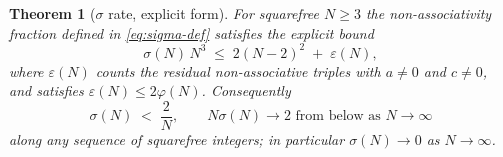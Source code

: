 \documentclass[11pt,reqno]{amsart}
\theoremstyle{plain}
\newtheorem{theorem}{Theorem}
\theoremstyle{definition}
\theoremstyle{remark}
\begin{document}
\begin{theorem}[$\sigma$ rate, explicit form]\label{thm:rate}
For squarefree $N\ge 3$ the non-associativity fraction defined in
\eqref{eq:sigma-def} satisfies the explicit bound
\begin{equation}\label{eq:rate}
  \sigma(N)\,N^{3}\;\le\;2(N-2)^{2}\;+\;\varepsilon(N),
\end{equation}
where $\varepsilon(N)$ counts the residual non-associative triples
with $a\neq 0$ \emph{and} $c\neq 0$, and satisfies
$\varepsilon(N)\le 2\varphi(N)$. Consequently
\begin{equation}\label{eq:rate-asymptotic}
  \sigma(N)\;<\;\frac{2}{N},
  \qquad N\sigma(N)\to 2 \text{ from below as } N\to\infty
\end{equation}
along any sequence of squarefree integers; in particular
$\sigma(N)\to 0$ as $N\to\infty$.
\end{theorem}
\end{document}
